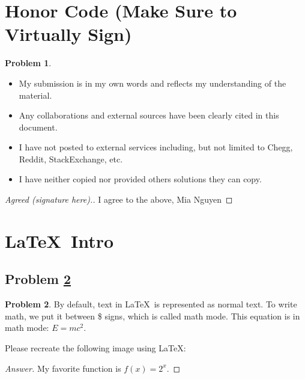 \documentclass[11pt]{article}
\theoremstyle{definition}
\theoremstyle{definition}
\newtheorem{required}{Problem}
\theoremstyle{definition}
\begin{document}
\section{Honor Code (Make Sure to Virtually Sign)} \label{HonorCode}

\begin{required}
\begin{itemize}
\item My submission is in my own words and reflects my understanding of the material.
\item Any collaborations and external sources have been clearly cited in this document.
\item I have not posted to external services including, but not limited to Chegg, Reddit, StackExchange, etc.
\item I have neither copied nor provided others solutions they can copy.
\end{itemize}

\end{required}

\begin{proof}[Agreed (signature here).]
I agree to the above, Mia Nguyen
\end{proof}


\newpage
\section{\LaTeX\ Intro}

\subsection{Problem \ref{Latex1}}
\begin{required} \label{Latex1}
By default, text in \LaTeX\ is represented as normal text. To write math, we put it between \$ signs, which is called math mode.
This equation is in math mode: $E=mc^2$.

Please recreate the following image using \LaTeX:

\end{required}

\begin{proof}[Answer]
My favorite function is $f(x) = 2^{x}$.
\end{proof}
\end{document}
